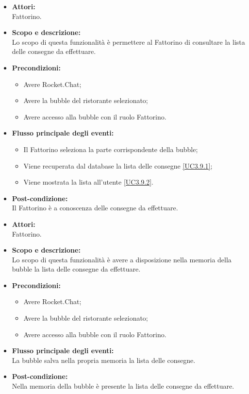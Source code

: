 \begin{itemize}
	\item \textbf{Attori:}
	\\Fattorino.
	\item \textbf{Scopo e descrizione:} 
	\\Lo scopo di questa funzionalità è permettere al Fattorino di consultare la lista delle consegne da effettuare.
	\item \textbf{Precondizioni:}
	\begin{itemize}
		\item Avere Rocket.Chat;
		\item Avere la bubble del ristorante selezionato;
		\item Avere accesso alla bubble con il ruolo Fattorino.
	\end{itemize}
	\item \textbf{Flusso principale degli eventi:}
	\begin{itemize}
		\item Il Fattorino seleziona la parte corrispondente della bubble;
		\item Viene recuperata dal database la lista delle consegne \ref{UC3.9.1};
		\item Viene mostrata la lista all'utente \ref{UC3.9.2}.
	\end{itemize}
	\item \textbf{Post-condizione:}
	\\Il Fattorino è a conoscenza delle consegne da effettuare.
\end{itemize}


\begin{itemize}
	\item \textbf{Attori:}
	\\Fattorino.
	\item \textbf{Scopo e descrizione:} 
	\\Lo scopo di questa funzionalità è avere a disposizione nella memoria della bubble la lista delle consegne da effettuare.
	\item \textbf{Precondizioni:}
	\begin{itemize}
		\item Avere Rocket.Chat;
		\item Avere la bubble del ristorante selezionato;
		\item Avere accesso alla bubble con il ruolo Fattorino.
	\end{itemize}
	\item \textbf{Flusso principale degli eventi:}
	\\La bubble salva nella propria memoria la lista delle consegne.
	\item \textbf{Post-condizione:}
	\\Nella memoria della bubble è presente la lista delle consegne da effettuare.
\end{itemize}


